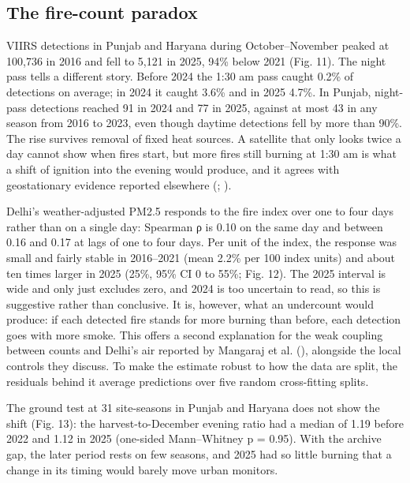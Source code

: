 \documentclass[
  11pt,
]{article}
\begin{document}
\subsection{The fire-count paradox}\label{the-fire-count-paradox}

VIIRS detections in Punjab and Haryana during October--November peaked
at 100,736 in 2016 and fell to 5,121 in 2025, 94\% below 2021 (Fig. 11).
The night pass tells a different story. Before 2024 the 1:30 am pass
caught 0.2\% of detections on average; in 2024 it caught 3.6\% and in
2025 4.7\%. In Punjab, night-pass detections reached 91 in 2024 and 77
in 2025, against at most 43 in any season from 2016 to 2023, even though
daytime detections fell by more than 90\%. The rise survives removal of
fixed heat sources. A satellite that only looks twice a day cannot show
when fires start, but more fires still burning at 1:30 am is what a
shift of ignition into the evening would produce, and it agrees with
geostationary evidence reported elsewhere
(;
).

Delhi's weather-adjusted PM2.5 responds to the fire index over one to
four days rather than on a single day: Spearman ρ is 0.10 on the same
day and between 0.16 and 0.17 at lags of one to four days. Per unit of
the index, the response was small and fairly stable in 2016--2021 (mean
2.2\% per 100 index units) and about ten times larger in 2025 (25\%,
95\% CI 0 to 55\%; Fig. 12). The 2025 interval is wide and only just
excludes zero, and 2024 is too uncertain to read, so this is suggestive
rather than conclusive. It is, however, what an undercount would
produce: if each detected fire stands for more burning than before, each
detection goes with more smoke. This offers a second explanation for the
weak coupling between counts and Delhi's air reported by {Mangaraj et
al.} (), alongside the local controls
they discuss. To make the estimate robust to how the data are split, the
residuals behind it average predictions over five random cross-fitting
splits.

The ground test at 31 site-seasons in Punjab and Haryana does not show
the shift (Fig. 13): the harvest-to-December evening ratio had a median
of 1.19 before 2022 and 1.12 in 2025 (one-sided Mann--Whitney p = 0.95).
With the archive gap, the later period rests on few seasons, and 2025
had so little burning that a change in its timing would barely move
urban monitors.
\end{document}
